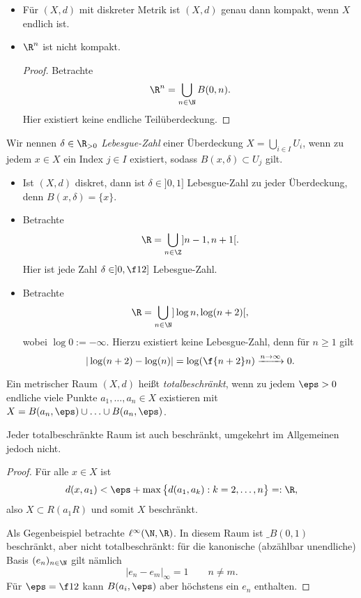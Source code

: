 \begin{ex}
	\begin{itemize}
		\item
			Für $(X,d)$ mit diskreter Metrik ist $(X,d)$ genau dann kompakt, wenn $X$ endlich ist.
		\item
			$\R^n$ ist nicht kompakt.
			\begin{proof}
				Betrachte
				\[
					\R^n = \bigcup_{n\in \N} B(0,n).
				\]
				Hier existiert keine endliche Teilüberdeckung.
			\end{proof}
	\end{itemize}
\end{ex}

\begin{df}
	Wir nennen $\delta \in \R_{>0}$ \emph{Lebesgue-Zahl} einer Überdeckung $X = \bigcup_{i\in I} U_i$,  wenn zu jedem $x \in X$ ein Index $j\in I$ existiert, sodass $B(x,\delta) \subset U_j$ gilt.
\end{df}

\begin{ex}
	\begin{itemize}
		\item
			Ist $(X,d)$ diskret, dann ist $\delta \in ]0,1]$ Lebesgue-Zahl zu jeder Überdeckung, denn $B(x,\delta) = \{x\}$.
		\item
			Betrachte
			\[
				\R = \bigcup_{n \in \Z} ]n-1, n+1[.
			\]
			Hier ist jede Zahl $\delta \in ]0,\f 12]$ Lebesgue-Zahl.
		\item
			Betrachte
			\[
				\R = \bigcup_{n\in\N} ] \log n, \log(n+2) [,
			\]
			wobei $\log 0 := -\infty$.
			Hierzu existiert keine Lebesgue-Zahl, denn für $n \ge 1$ gilt
			\[
				|\log (n+2) - \log(n)| = \log (\f {n+2}n) \xrightarrow{n\to\infty} 0.
			\]
	\end{itemize}
\end{ex}

\begin{df}
	Ein metrischer Raum $(X,d)$ heißt \emph{totalbeschränkt}, wenn zu jedem $\eps > 0$ endliche viele Punkte $a_1, \dotsc, a_n \in X$ existieren mit $X = B(a_n,\eps) \cup \dotsc \cup B(a_n,\eps)$.
\end{df}

\begin{nt}
	Jeder totalbeschränkte Raum ist auch beschränkt, umgekehrt im Allgemeinen jedoch nicht.
	\begin{proof}
		Für alle $x \in X$ ist
		\[
			d(x,a_1) < \eps + \max \big\{d(a_1, a_k) : k = 2,\dotsc, n \big\} =: \R,
		\]
		also $X \subset R(a_1 R)$ und somit $X$ beschränkt.

		Als Gegenbeispiel betrachte $\ell^\infty(\N, \R)$.
		In diesem Raum ist $\_B(0,1)$ beschränkt, aber nicht totalbeschränkt:
		für die kanonische (abzählbar unendliche) Basis $(e_n)_{n\in \N}$ gilt nämlich
		\[
			|e_n - e_m|_\infty = 1
			\qquad n \neq m.
		\]
		Für $\eps = \f 12$ kann $B(a_i,\eps)$ aber höchstens ein $e_n$ enthalten.
	\end{proof}
\end{nt}

